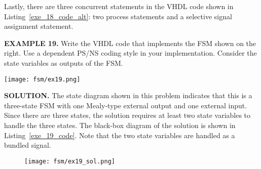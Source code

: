 Lastly, there are three concurrent statements in the VHDL code shown in Listing~\ref{exe_18_code_alt}: two process statements and a selective signal assignment statement. 

\begin{leftbar}
\begin{minipage}[t]{0.5\textwidth}
\vspace{10pt}
\noindent
\textbf{EXAMPLE 19.}
Write the VHDL code that implements the FSM shown on the right. Use a dependent PS/NS coding style in your implementation. Consider the state variables as outputs of the FSM.
\end{minipage}
\begin{minipage}[t]{0.47\textwidth}
\vspace{0pt}\raggedright
\centering
\texttt{[image: fsm/ex19.png]}
\end{minipage}
\end{leftbar}
\noindent
\textbf{SOLUTION.} The state diagram shown in this problem indicates that this is a three-state FSM with one Mealy-type external output and one external input. Since there are three states, the solution requires at least two state variables to handle the three states. The black-box diagram of the solution is shown in Listing~\ref{exe_19_code}. Note that the two state variables are handled as a bundled signal.


\begin{figure}[!h]
    \centering
	\texttt{[image: fsm/ex19\_sol.png]}
\end{figure}

